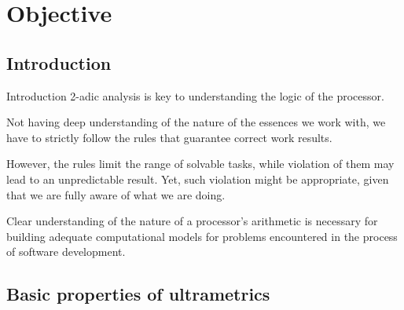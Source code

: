 


\section{Objective}

\subsection{Introduction}

\begin{frame}{Introduction}
2-adic analysis is key to understanding the logic of the processor.  
\pause

Not having deep understanding of the nature of the essences we work with, we have to strictly follow the rules that guarantee correct work results.
\pause

 However, the rules limit the range of solvable tasks, while violation of them may lead to an unpredictable result. Yet, such violation might be appropriate, given that we are fully aware of what we are doing.
\pause

Clear understanding of the nature of a processor's arithmetic is necessary for
building adequate computational models for problems encountered in the process of software development.
\end{frame}


\subsection{Basic properties of ultrametrics}


